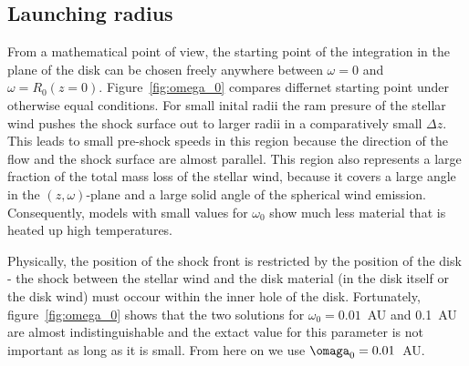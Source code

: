 \subsection{Launching radius}
From a mathematical point of view, the starting point of the integration in the plane of the disk can be chosen freely anywhere between $\omega=0$ and $\omega=R_0(z=0)$. Figure~\ref{fig:omega_0} compares differnet starting point under otherwise equal conditions. For small inital radii the ram presure of the stellar wind pushes the shock surface out to larger radii in a comparatively small $\Delta z$. This leads to small pre-shock speeds in this region because the direction of the flow and the shock surface are almost parallel. This region also represents a large fraction of the total mass loss of the stellar wind, because it covers a large angle in the $(z,\omega)$-plane and a large solid angle of the spherical wind emission. Consequently, models with small values for $\omega_0$ show much less material that is heated up high temperatures. 

Physically, the position of the shock front is restricted by the position of the disk - the shock between the stellar wind and the disk material (in the disk itself or the disk wind) must occour within the inner hole of the disk. Fortunately, figure~\ref{fig:omega_0} shows that the two solutions for $\omega_0=0.01$~AU and 0.1~AU are almost indistinguishable and the extact value for this parameter is not important as long as it is small. From here on we use $\omaga_0 = 0.01$~AU.
